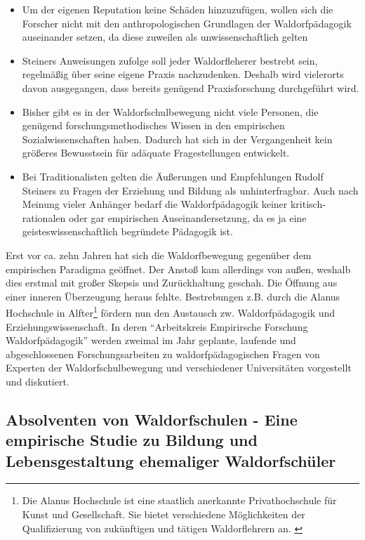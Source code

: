 	\begin{itemize}
    	\item Um der eigenen Reputation keine Schäden hinzuzufügen, wollen sich die Forscher nicht mit den anthropologischen Grundlagen der Waldorfpädagogik auseinander setzen, da diese zuweilen als unwissenschaftlich gelten

    	\item Steiners Anweisungen zufolge soll jeder Waldorfleherer bestrebt sein, regelmäßig über seine eigene Praxis nachzudenken. Deshalb wird vielerorts davon ausgegangen, dass bereits genügend Praxisforschung durchgeführt wird.

    	\item Bisher gibt es in der Waldorfschulbewegung nicht viele Personen, die genügend forschungsmethodisches Wissen in den empirischen Sozialwissenschaften haben. Dadurch hat sich in der Vergangenheit kein größeres Bewusstsein für adäquate Fragestellungen entwickelt. 

    	\item Bei Traditionalisten gelten die Äußerungen und Empfehlungen Rudolf Steiners zu Fragen der Erziehung und Bildung als unhinterfragbar. Auch nach Meinung vieler Anhänger bedarf die Waldorfpädagogik keiner kritisch-rationalen oder gar empirischen Auseinandersetzung, da es ja eine geisteswissenschaftlich begründete Pädagogik ist. 
    \end{itemize}

Erst vor ca. zehn Jahren hat sich die Waldorfbewegung gegenüber dem empirischen Paradigma geöffnet. Der Anstoß kam allerdings von außen, weshalb dies erstmal mit großer Skepsis und Zurückhaltung geschah. Die Öffnung aus einer inneren Überzeugung heraus fehlte. Bestrebungen z.B. durch die Alanus Hochschule in Alfter\footnote{Die Alanus Hochschule ist eine staatlich anerkannte Privathochschule für Kunst und Gesellschaft. Sie bietet verschiedene Möglichkeiten der Qualifizierung von zukünftigen und tätigen Waldorflehrern an. \citep[Vgl.][]{alanus13}} fördern nun den Austausch zw. Waldorfpädagogik und Erziehungswissenschaft. In deren \enquote{Arbeitskreis Empirirsche Forschung Waldorfpädagogik} werden zweimal im Jahr geplante, laufende und abgeschlossenen Forschungsarbeiten zu waldorfpädagogischen Fragen von Experten der Waldorfschulbewegung und verschiedener Universitäten vorgestellt und diskutiert.  \citep[Vgl.][S. 128]{paschen10}

\subsection{Absolventen von Waldorfschulen - Eine empirische Studie zu Bildung und Lebensgestaltung ehemaliger Waldorfschüler} %
\label{Studie}

